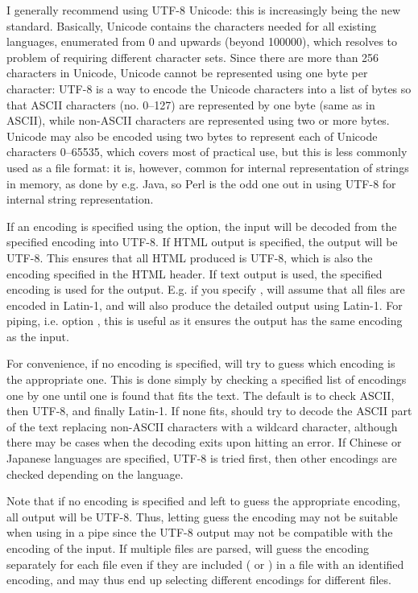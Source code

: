 \documentclass{article}
\begin{document}
I generally recommend using UTF-8 Unicode: this is increasingly being the new standard. Basically, Unicode contains the characters needed for all existing languages, enumerated from 0 and upwards (beyond 100000), which resolves to problem of requiring different character sets. Since there are more than 256 characters in Unicode, Unicode cannot be represented using one byte per character: UTF-8 is a way to encode the Unicode characters into a list of bytes so that ASCII characters (no. 0--127) are represented by one byte (same as in ASCII), while non-ASCII characters are represented using two or more bytes. Unicode may also be encoded using two bytes to represent each of Unicode characters 0--65535, which covers most of practical use, but this is less commonly used as a file format: it is, however, common for internal representation of strings in memory, as done by e.g. Java, so Perl is the odd one out in using UTF-8 for internal string representation.

If an encoding is specified using the  option, the input will be decoded from the specified encoding into UTF-8. If HTML output is specified, the output will be UTF-8. This ensures that all HTML produced is UTF-8, which is also the encoding specified in the HTML header. If text output is used, the specified encoding is used for the output. E.g. if you specify , \TeXcount{} will assume that all files are encoded in Latin-1, and will also produce the detailed output using Latin-1. For piping, i.e. option \code{-}, this is useful as it ensures the output has the same encoding as the input.

For convenience, if no encoding is specified, \TeXcount{} will try to guess which encoding is the appropriate one. This is done simply by checking a specified list of encodings one by one until one is found that fits the text. The default is to check ASCII, then UTF-8, and finally Latin-1. If none fits, \TeXcount{} should try to decode the ASCII part of the text replacing non-ASCII characters with a wildcard character, although there may be cases when the decoding exits upon hitting an error. If Chinese or Japanese languages are specified, UTF-8 is tried first, then other encodings are checked depending on the language.

Note that if no encoding is specified and \TeXcount{} left to guess the appropriate encoding, all output will be UTF-8. Thus, letting \TeXcount{} guess the encoding may not be suitable when using \TeXcount{} in a pipe since the UTF-8 output may not be compatible with the encoding of the input. If multiple files are parsed, \TeXcount{} will guess the encoding separately for each file even if they are included ( or ) in a file with an identified encoding, and may thus end up selecting different encodings for different files.
\end{document}

